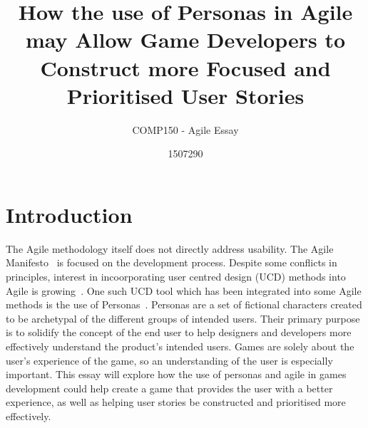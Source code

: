\documentclass{scrartcl}
\title{How the use of Personas in Agile may Allow Game Developers to Construct more Focused and Prioritised User Stories}
\subtitle{COMP150 - Agile Essay}
\author{1507290}
\begin{document}
\maketitle


\section{Introduction}
The Agile methodology itself does not directly address usability. The Agile Manifesto~\cite{} is focused on the development process. Despite some conflicts in principles, interest in incoorporating user centred design (UCD) methods into Agile is growing~\cite{haikara:extending}. One such UCD tool which has been integrated into some Agile methods is the use of Personas~\cite{caballero:persona}. Personas are a set of fictional characters created to be archetypal of the different groups of intended users. Their primary purpose is to solidify the concept of the end user to help designers and developers more effectively understand the product's intended users. 
Games are solely about the user's experience of the game, so an understanding of the user is especially important. This essay will explore how the use of personas and agile in games development could help create a game that provides the user with a better experience, as well as helping user stories be constructed and prioritised more effectively.

\end{document}
